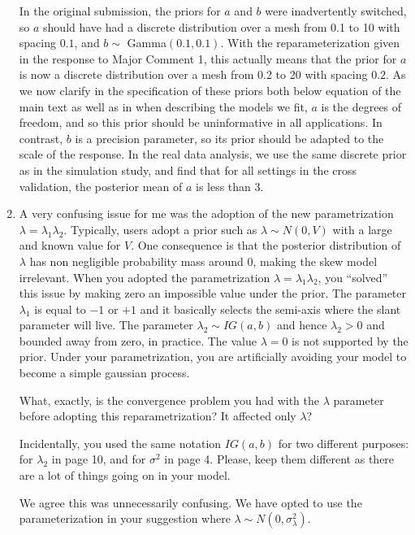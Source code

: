 \documentclass[11pt]{article}
\begin{document}
\begin{enumerate}[1.]
\begin{response}
  In the original submission, the priors for $a$ and $b$ were inadvertently switched, so $a$ should have had a discrete distribution over a mesh from 0.1 to 10 with spacing $0.1$, and $b \sim$ Gamma$(0.1, 0.1)$.
  With the reparameterization given in the response to Major Comment 1, this actually means that the prior for $a$ is now a discrete distribution over a mesh from 0.2 to 20 with spacing $0.2$.
  As we now clarify in the specification of these priors both below equation  of the main text as well as in  when describing the models we fit, $a$ is the degrees of freedom, and so this prior should be uninformative in all applications.
  In contrast, $b$ is a precision parameter, so its prior should be adapted to the scale of the response.
  In the real data analysis, we use the same discrete prior as in the simulation study, and find that for all settings in the cross validation, the posterior mean of $a$ is less than 3.
\end{response}

\item A very confusing issue for me was the adoption of the new parametrization $\lambda = \lambda_1 \lambda_2$. Typically, users adopt a prior such as $\lambda \sim N(0,V)$ with a large and known value for $V$. One consequence is that the posterior distribution of $\lambda$ has non negligible probability mass around 0, making the skew model irrelevant. When you adopted the parametrization $\lambda = \lambda_1 \lambda_2$, you ``solved'' this issue by making zero an impossible value under the prior. The parameter $\lambda_1$ is equal to $−1$ or $+1$ and it basically selects the semi-axis where the slant parameter will live. The parameter $\lambda_2 \sim IG(a, b)$ and hence $\lambda_2 > 0$ and bounded away from zero, in practice. The value $\lambda = 0$ is not supported by the prior. Under your parametrization, you are artificially avoiding your model to become a simple gaussian process.

What, exactly, is the convergence problem you had with the $\lambda$ parameter before adopting this reparametrization?
It affected only $\lambda$?

Incidentally, you used the same notation $IG(a,b)$ for two different purposes: for $\lambda_2$ in page 10, and for $\sigma^2$ in page 4. Please, keep them different as there are a lot of things going on in your model.\\

\begin{response}
  We agree this was unnecessarily confusing.
  We have opted to use the parameterization in your suggestion where $\lambda \sim N(0, \sigma^2_\lambda)$.
\end{response}


\end{enumerate}
\end{document}
